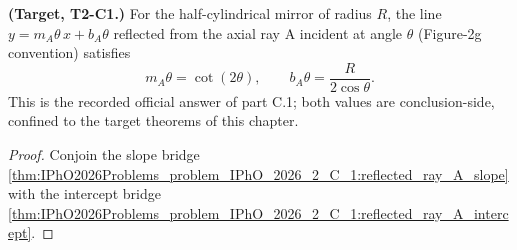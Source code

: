 \begin{theorem}
\label{thm:IPhO2026Problems_problem_IPhO_2026_2_C_1:reflected_ray_A_slope_and_intercept}
\textbf{(Target, T2-C1.)}  For the half-cylindrical mirror of radius
$R$, the line $y = m_A\theta\,x + b_A\theta$ reflected from the axial
ray A incident at angle $\theta$ (Figure-2g convention) satisfies
\[
m_A\theta = \cot(2\theta), \qquad b_A\theta = \frac{R}{2\cos\theta} .
\]
This is the recorded official answer of part C.1; both values are
conclusion-side, confined to the target theorems of this chapter.
\end{theorem}
\begin{proof}
Conjoin the slope bridge
\cref{thm:IPhO2026Problems_problem_IPhO_2026_2_C_1:reflected_ray_A_slope}
with the intercept bridge
\cref{thm:IPhO2026Problems_problem_IPhO_2026_2_C_1:reflected_ray_A_intercept}.
\end{proof}
